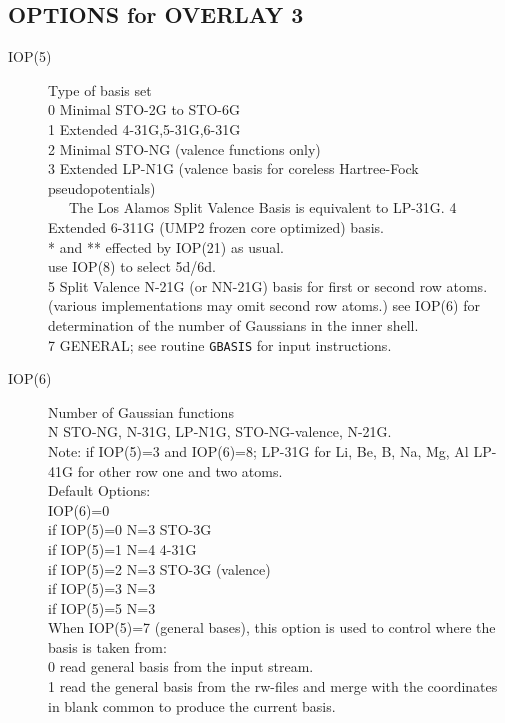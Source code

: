 \subsection{\sf OPTIONS for OVERLAY 3}
\begin{description}
\item[IOP(5)]  Type of basis set  \\
0  Minimal STO-2G to STO-6G  \\
1  Extended 4-31G,5-31G,6-31G \\
2  Minimal STO-NG (valence functions only) \\
3  Extended LP-N1G (valence basis for coreless Hartree-Fock 
pseudopotentials)  \\
\ \ \ The Los Alamos Split Valence Basis is equivalent to
LP-31G.
4  Extended 6-311G (UMP2 frozen core optimized) basis. \\
* and ** effected by IOP(21) as usual.  \\
use IOP(8) to select 5d/6d.  \\
5  Split Valence N-21G (or NN-21G) basis for first or 
second row atoms. (various implementations may omit
second row atoms.) see IOP(6) for determination of the
number of Gaussians in the inner shell.  \\
7  GENERAL;  see routine {\tt GBASIS} for input instructions. \\
\item[IOP(6)]  Number of Gaussian functions \\
N STO-NG, N-31G, LP-N1G, STO-NG-valence, N-21G.  \\
Note: if IOP(5)=3 and IOP(6)=8; LP-31G for Li, Be, B, Na, Mg, Al
LP-41G for other row one and two
atoms.  \\
Default Options:  \\
  IOP(6)=0  \\
if IOP(5)=0 N=3 STO-3G  \\
if IOP(5)=1 N=4 4-31G  \\
if IOP(5)=2 N=3 STO-3G (valence)  \\
if IOP(5)=3 N=3  \\
if IOP(5)=5 N=3  \\
When IOP(5)=7 (general bases), this option is used to control where the
basis is taken from:  \\
0  read general basis from the input stream. \\
1  read the general basis from the rw-files and merge with 
the coordinates in blank common to produce the current
basis.  \\

\end{description}
